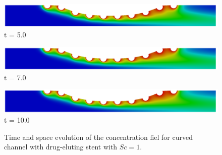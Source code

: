 \begin{figure}[H]
     \begin{minipage}{.50\linewidth}
      \centering
      \includegraphics[scale=0.12]{./02_chaps/cap_solution/figure/conc1_CurvedStrut10000.png}\\
      t = 5.0
     \end{minipage}
     \begin{minipage}{.50\linewidth}
     \medskip
      \centering
      \includegraphics[scale=0.12]{./02_chaps/cap_solution/figure/conc1_CurvedStrut14000.png}\\
      t = 7.0
     \end{minipage}%
     \begin{minipage}{.50\linewidth}
     \medskip
      \centering
      \includegraphics[scale=0.12]{./02_chaps/cap_solution/figure/conc1_CurvedStrut20000.png}\\
      t = 10.0
     \end{minipage}
     \medskip
     \caption{
Time and space evolution of the concentration fiel for curved channel with drug-eluting stent with $Sc=1$.}
     \label{conc field curved stent sc 1}
\end{figure}

